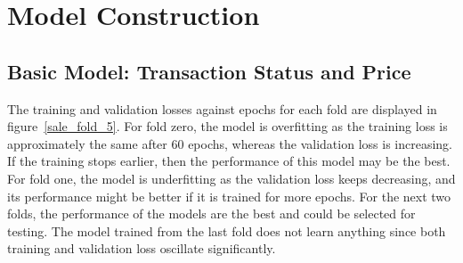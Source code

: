 \documentclass[12pt,twoside]{report}
\begin{document}
\section{Model Construction}

\subsection{Basic Model: Transaction Status and Price}
The training and validation losses against epochs for each fold are displayed in \mbox{figure \ref{sale_fold_5}}. For fold zero, the model is overfitting as the training loss is approximately the same after 60 epochs, whereas the validation loss is increasing. If the training stops earlier, then the performance of this model may be the best. For fold one, the model is underfitting as the validation loss keeps decreasing, and its performance might be better if it is trained for more epochs. For the next two folds, the performance of the models are the best and could be selected for testing. The model trained from the last fold does not learn anything since both training and validation loss oscillate significantly. 
\\
\end{document}
